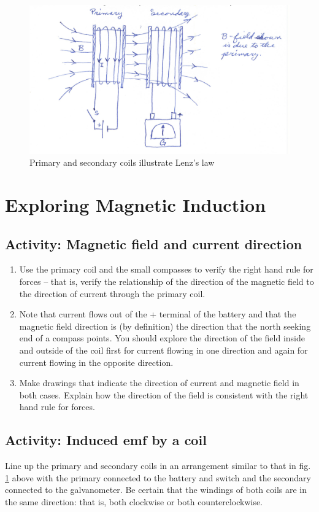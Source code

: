\begin{figure}
	\centering
	\includegraphics[scale=0.6]{5bgraf/fig_13}
	\caption{Primary and secondary coils illustrate Lenz's law}
	\label{f:fig13}
\end{figure}


\section{Exploring Magnetic Induction}

\subsection{Activity: Magnetic field and current direction}
\begin{enumerate}
	 \item 	Use the primary coil and the small compasses to verify the \textsf{right hand rule for forces} -- that is, verify the relationship of the direction of the magnetic field to the direction of current through the primary coil.
	 \item 	Note that current flows out of the + terminal of the battery and that the magnetic field direction is (by definition) the direction that the north seeking end of a compass points.  You should explore the direction of the field inside and outside of the coil first for current flowing in one direction and again for current flowing in the opposite direction.
	 \item 	Make drawings that indicate the direction of current and magnetic field in both cases.  Explain how the direction of the field is consistent with the \textsf{right hand rule for forces}.
\end{enumerate}

\subsection{Activity: Induced emf by a coil} \label{s:coilind}
	Line up the primary and secondary coils in an arrangement similar to that in fig. \ref{f:fig13} above with the primary connected to the battery and switch and the secondary connected to the galvanometer.  Be certain that the windings of both coils are in the same direction: that is, both clockwise or both counterclockwise. 
	
